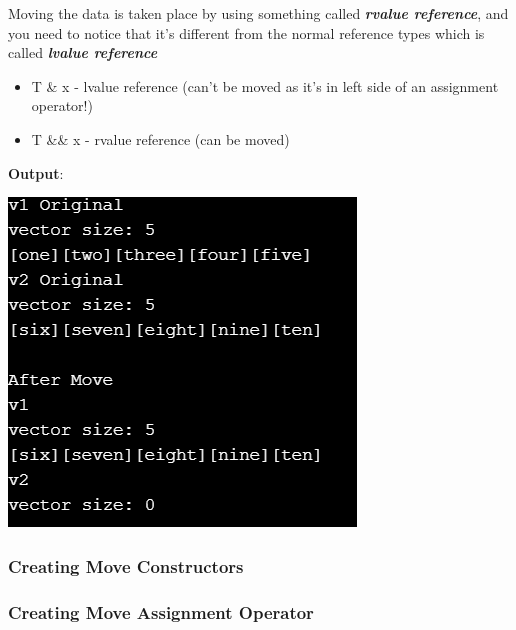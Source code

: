 \documentclass{article}
\begin{document}
Moving the data is taken place by using something called \textbf{\textit{rvalue reference}}, and you need to notice that it's different from the normal reference types which is called \textbf{\textit{lvalue reference}} 
\begin{itemize}
  \item T \& x    - lvalue reference (can't be moved as it's in left side of an assignment operator!)
  \item T \&\& x  - rvalue reference (can be moved)
\end{itemize}


\textbf{Output}:\\
\begin{center}
  \includegraphics[scale=0.75]{./cpp_code/new_features/move-semantics01.PNG}
\end{center}

\subsubsection{Creating Move Constructors}

\subsubsection{Creating Move Assignment Operator}
\end{document}
